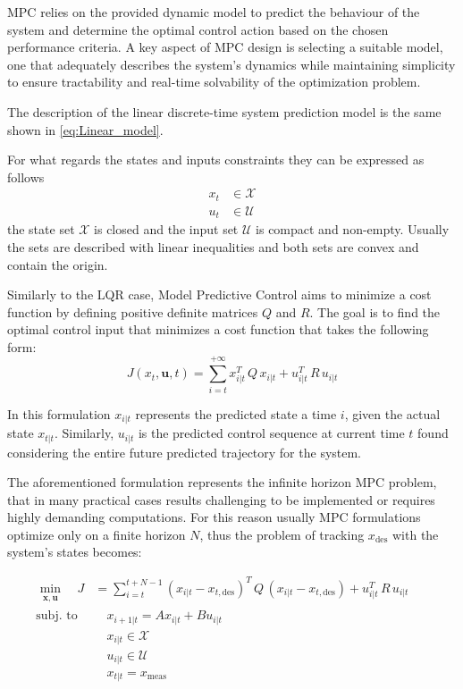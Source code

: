 \documentclass[a4paper,12pt,oneside]{book}
\begin{document}
\bigskip
MPC relies on the provided dynamic model to predict the behaviour of the system and determine the optimal control action based on the chosen performance criteria. 
A key aspect of MPC design is selecting a suitable model, one that adequately describes the system's dynamics while maintaining simplicity to ensure tractability and real-time solvability of the optimization problem.

\bigskip
The description of the linear discrete-time system prediction model is the same shown in \ref{eq:Linear_model}.

For what regards the states and inputs constraints they can be expressed as follows
\begin{align}
    x_t & \in \mathcal{X} \\
    u_t & \in \mathcal{U}
\end{align}
the state set $\mathcal{X}$ is closed and the input set $\mathcal{U}$ is compact and non-empty. Usually the sets are described with linear inequalities and both sets are convex and contain the origin.

\bigskip
Similarly to the LQR case, Model Predictive Control aims to minimize a cost function by defining positive definite matrices $Q$ and $R$. The goal is to find the optimal control input that minimizes a cost function that takes the following form:
\begin{equation}
    J(x_t, \boldsymbol{u}, t) = \sum_{i=t} ^{+ \infty} x_{i|t}^T \, Q \, x_{i|t} + u_{i|t}^T \, R \, u_{i|t}
\end{equation}

In this formulation $x_{i|t}$ represents the predicted state a time $i$, given the actual state $x_{t|t}$. 
Similarly, $u_{i|t}$ is the predicted control sequence at current time $t$ found considering the entire future predicted trajectory for the system.

The aforementioned formulation represents the infinite horizon MPC problem, that in many practical cases results challenging to be implemented or requires highly demanding computations.
For this reason usually MPC formulations optimize only on a finite horizon $N$, thus the problem of tracking $x_{\text{des}}$ with the system's states becomes:

\begin{equation}
\begin{alignedat}{2}
	\min_{\substack{\boldsymbol{x}, \boldsymbol{u}}}\quad J &= \sum_{i=t}^{t+N-1} (x_{i|t} - x_{t,\text{des}}) ^T \, Q \, (x_{i|t} - x_{t,\text{des}}) +  u_{i|t}^T \, R \, u_{i|t} &&   \\
	\text{subj. to} & \quad x_{i+1|t}  = A x_{i|t} + B u_{i|t}  &&  \\
     &\quad x_{i|t} \in \mathcal{X} && \\
    &\quad u_{i|t} \in \mathcal{U} && \\
    &\quad x_{t|t} = x_{\text{meas}} && 
\end{alignedat}
\label{MPC1}
\end{equation}
\end{document}
